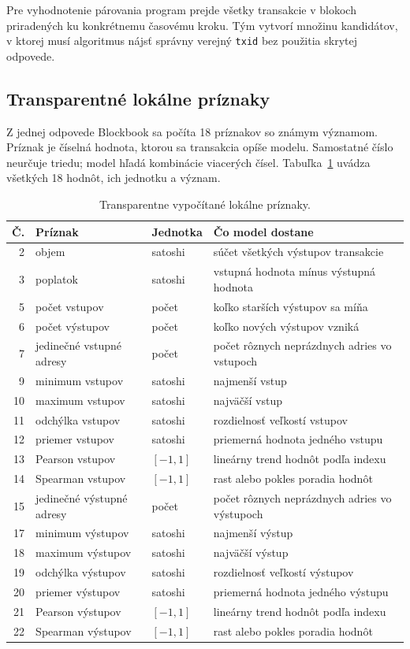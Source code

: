 Pre vyhodnotenie párovania program prejde všetky transakcie v blokoch
priradených ku konkrétnemu časovému
kroku. Tým vytvorí množinu kandidátov, v ktorej musí algoritmus nájsť
správny verejný \texttt{txid} bez použitia skrytej odpovede.

\subsection{Transparentné lokálne príznaky}

Z jednej odpovede Blockbook sa počíta 18 príznakov so známym významom.
Príznak je číselná hodnota, ktorou sa transakcia opíše modelu.
Samostatné číslo neurčuje triedu; model hľadá kombinácie viacerých
čísel. Tabuľka~\ref{tab:transparent-features} uvádza všetkých 18
hodnôt, ich jednotku a význam.

\begin{table}[p]
  \centering
  \scriptsize
  \caption{Transparentne vypočítané lokálne príznaky.}
  \label{tab:transparent-features}
  \begin{tabularx}{\textwidth}{r l l X}
    \toprule
    Č. & Príznak & Jednotka & Čo model dostane \\
    \midrule
    2 & objem & satoshi & súčet všetkých výstupov transakcie \\
    3 & poplatok & satoshi & vstupná hodnota mínus výstupná hodnota \\
    5 & počet vstupov & počet & koľko starších výstupov sa míňa \\
    6 & počet výstupov & počet & koľko nových výstupov vzniká \\
    7 & jedinečné vstupné adresy & počet & počet rôznych neprázdnych adries vo vstupoch \\
    9 & minimum vstupov & satoshi & najmenší vstup \\
    10 & maximum vstupov & satoshi & najväčší vstup \\
    11 & odchýlka vstupov & satoshi & rozdielnosť veľkostí vstupov \\
    12 & priemer vstupov & satoshi & priemerná hodnota jedného vstupu \\
    13 & Pearson vstupov & $[-1,1]$ & lineárny trend hodnôt podľa indexu \\
    14 & Spearman vstupov & $[-1,1]$ & rast alebo pokles poradia hodnôt \\
    15 & jedinečné výstupné adresy & počet & počet rôznych neprázdnych adries vo výstupoch \\
    17 & minimum výstupov & satoshi & najmenší výstup \\
    18 & maximum výstupov & satoshi & najväčší výstup \\
    19 & odchýlka výstupov & satoshi & rozdielnosť veľkostí výstupov \\
    20 & priemer výstupov & satoshi & priemerná hodnota jedného výstupu \\
    21 & Pearson výstupov & $[-1,1]$ & lineárny trend hodnôt podľa indexu \\
    22 & Spearman výstupov & $[-1,1]$ & rast alebo pokles poradia hodnôt \\
    \bottomrule
  \end{tabularx}
\end{table}

